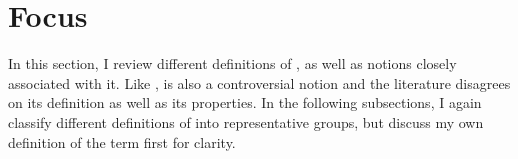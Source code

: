 %
%
%



\section{Focus}\label{BackSecFocus}

In this section, I review different definitions of , as well as notions closely associated with it.
Like ,  is also a controversial notion and the literature disagrees on its definition as well as its properties.
In the following subsections, I again classify different definitions of  into representative groups, but discuss my own definition of the term first for clarity. 

